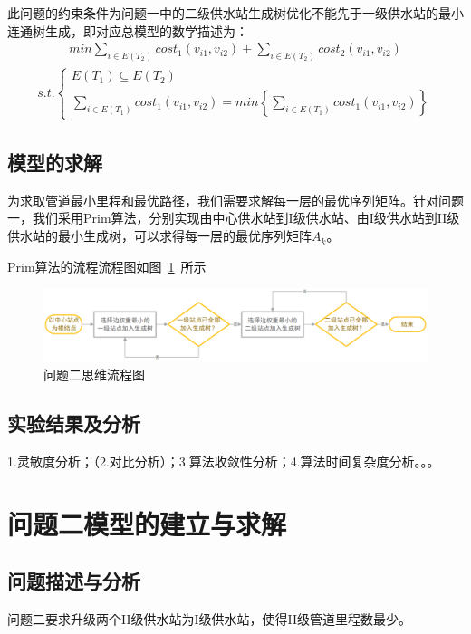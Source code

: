 \documentclass{whutmod}
\begin{document}
			此问题的约束条件为问题一中的二级供水站生成树优化不能先于一级供水站的最小连通树生成，即对应总模型的数学描述为：
			\begin{gather}
			min	\sum_{i\in E(T_2) }cost_1(v_{i1},v_{i2})+\sum_{i\in E(T_2) }cost_2(v_{i1},v_{i2})
			\end{gather}
			\begin{gather*}
			s.t.\left\{\begin{matrix}
			E(T_{1})\subseteq  E(T_{2})\\ 
				\sum_{i\in E(T_1) }cost_1(v_{i1},v_{i2})=min\left \{ 	\sum_{i\in E(T_1) }cost_1(v_{i1},v_{i2}) \right \} 
						\end{matrix}\right.
			\end{gather*}
		\subsection{模型的求解}
		为求取管道最小里程和最优路径，我们需要求解每一层的最优序列矩阵。针对问题一，我们采用Prim算法，分别实现由中心供水站到I级供水站、由I级供水站到II级供水站的最小生成树，可以求得每一层的最优序列矩阵$A_k$。
		
		Prim算法的流程流程图如图~\ref{dsf}~所示
		\begin{figure}[H]
		\centering
		\includegraphics[width=\textwidth]{figures/a1.png}
		\caption{问题二思维流程图}\label{dsf}
	\end{figure}
		
        \subsection{实验结果及分析}
  1.灵敏度分析；（2.对比分析）；3.算法收敛性分析；4.算法时间复杂度分析。。。
	\section{问题二模型的建立与求解}
		\subsection{问题描述与分析}
			问题二要求升级两个II级供水站为I级供水站，使得II级管道里程数最少。
			
\end{document}
